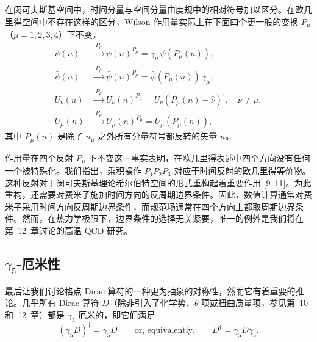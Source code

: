 在闵可夫斯基空间中，时间分量与空间分量由度规中的相对符号加以区分。在欧几里得空间中不存在这样的区分，Wilson 作用量实际上在下面四个更一般的变换 $P_\mu$（$\mu = 1, 2, 3, 4$）下不变，
\begin{equation}
  \begin{aligned}
    \psi(n) &\xrightarrow{\;P_\mu\;} \psi(n)^{P_\mu} = \gamma_\mu\,\psi(P_\mu(n)),\\
    \bar{\psi}(n) &\xrightarrow{\;P_\mu\;} \bar{\psi}(n)^{P_\mu} = \bar{\psi}(P_\mu(n))\,\gamma_\mu,\\
    U_\nu(n) &\xrightarrow{\;P_\mu\;} U_\nu(n)^{P_\mu} = U_\nu(P_\mu(n)-\hat{\nu})^\dagger, \quad \nu \neq \mu,\\
    U_\mu(n) &\xrightarrow{\;P_\mu\;} U_\mu(n)^{P_\mu} = U_\mu(P_\mu(n)) ,
  \end{aligned}
\end{equation}
其中 $P_\mu(n)$ 是除了 $n_\mu$ 之外所有分量符号都反转的矢量 $n$。

作用量在四个反射 $P_\mu$ 下不变这一事实表明，在欧几里得表述中四个方向没有任何一个被特殊化。我们指出，乘积操作 $P_1 P_2 P_3$ 对应于时间反射的欧几里得等价物。这种反射对于闵可夫斯基理论希尔伯特空间的形式重构起着重要作用 [9--11]。为此重构，还需要对费米子施加时间方向的反周期边界条件。因此，数值计算通常对费米子采用时间方向反周期边界条件，而规范场通常在四个方向上都取周期边界条件。然而，在热力学极限下，边界条件的选择无关紧要，唯一的例外是我们将在第~12~章讨论的高温 QCD 研究。

\subsection{$\gamma_5$-厄米性}

最后让我们讨论格点 Dirac 算符的一种更为抽象的对称性，然而它有着重要的推论。几乎所有 Dirac 算符 $D$（除非引入了化学势、$\theta$ 项或扭曲质量项，参见第~10 和~12~章）都是 $\gamma_5$-厄米的，即它们满足
\begin{equation}
  (\gamma_5 D)^\dagger = \gamma_5 D
  \qquad \text{or, equivalently,} \qquad
  D^\dagger = \gamma_5 D \gamma_5 .
\end{equation}

